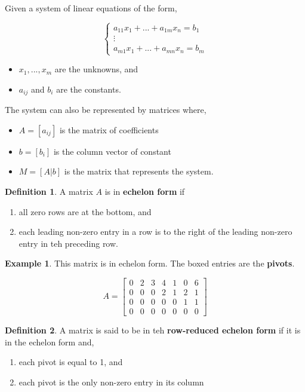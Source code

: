 \documentclass{report}
\theoremstyle{definition}
\newtheorem*{_def}{Definition}
\newtheorem{ex}{Example}[section]
\theoremstyle{remark}
\begin{document}
Given a system of linear equations of the form,

\[\left\{ 
  \begin{array}{c}
    a_{11}x_1+...+a_{1m}x_n=b_1 \\
    \vdots \\
    a_{m1}x_1+...+a_{mn}x_n=b_m
  \end{array} \right.\]

\begin{itemize}
 \item $x_1,...,x_m$ are the unknowns, and
 \item $a_{ij}$ and $b_i$ are the constants.
\end{itemize}

The system can also be represented by matrices where,

\begin{itemize}
 \item $A=[a_{ij}]$ is the matrix of coefficients
 \item $b=[b_i]$ is the column vector of constant
 \item $M=[A|b]$ is the matrix that represents the system.
\end{itemize}

\begin{_def}
A matrix $A$ is in \textbf{echelon form} if 
\begin{enumerate}
 \item all zero rows are at the bottom, and
 \item each leading non-zero entry in a row is to the right of the leading non-zero entry in teh preceding row.
\end{enumerate}
\end{_def}

\begin{ex}
This matrix is in echelon form.
The boxed entries are the \textbf{pivots}.

\[A=
\begin{bmatrix}
 0 & \boxed{2} & 3 & 4 & 1 & 0 & 6 \\
 0 & 0 & 0 & \boxed{2} & 1 & 2 & 1 \\
 0 & 0 & 0 & 0 & 0 & \boxed{1} & 1 \\
 0 & 0 & 0 & 0 & 0 & 0 & 0
\end{bmatrix}
\]
\end{ex}

\begin{_def}
A matrix is said to be in teh \textbf{row-reduced echelon form} if it is in the echelon form and,
\begin{enumerate}
 \item each pivot is equal to 1, and
 \item each pivot is the only non-zero entry in its column
\end{enumerate}
\end{_def}
\end{document}
